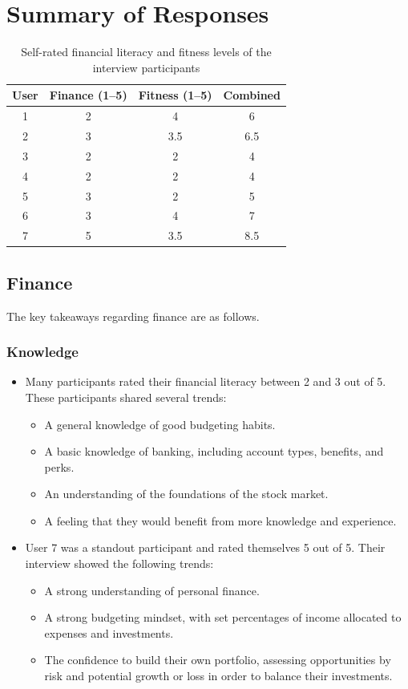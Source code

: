 \documentclass[12pt]{article}
\begin{document}
\section{Summary of Responses}
\begin{table}[h]
\centering
\begin{tabular}{|c|c|c|c|}
\hline
\textbf{User} & \textbf{Finance (1--5)} & \textbf{Fitness (1--5)} & \textbf{Combined} \\ \hline
1 & 2 & 4 & 6 \\ \hline
2 & 3 & 3.5 & 6.5 \\ \hline
3 & 2 & 2 & 4 \\ \hline
4 & 2 & 2 & 4 \\ \hline
5 & 3 & 2 & 5 \\ \hline
6 & 3 & 4 & 7 \\ \hline
7 & 5 & 3.5 & 8.5 \\ \hline
\end{tabular}
\caption{Self-rated financial literacy and fitness levels of the interview participants}
\label{tab:interview-ratings}
\end{table}

\subsection{Finance}
The key takeaways regarding finance are as follows.

\subsubsection{Knowledge}
\begin{itemize}
    \item Many participants rated their financial literacy between 2 and 3 out of 5. These participants shared several trends:
    \begin{itemize}
        \item A general knowledge of good budgeting habits.
        \item A basic knowledge of banking, including account types, benefits, and perks.
        \item An understanding of the foundations of the stock market.
        \item A feeling that they would benefit from more knowledge and experience.
    \end{itemize}
    \item User 7 was a standout participant and rated themselves 5 out of 5. Their interview showed the following trends:
    \begin{itemize}
        \item A strong understanding of personal finance.
        \item A strong budgeting mindset, with set percentages of income allocated to expenses and investments.
        \item The confidence to build their own portfolio, assessing opportunities by risk and potential growth or loss in order to balance their investments.
    \end{itemize}
\end{itemize}
\end{document}
